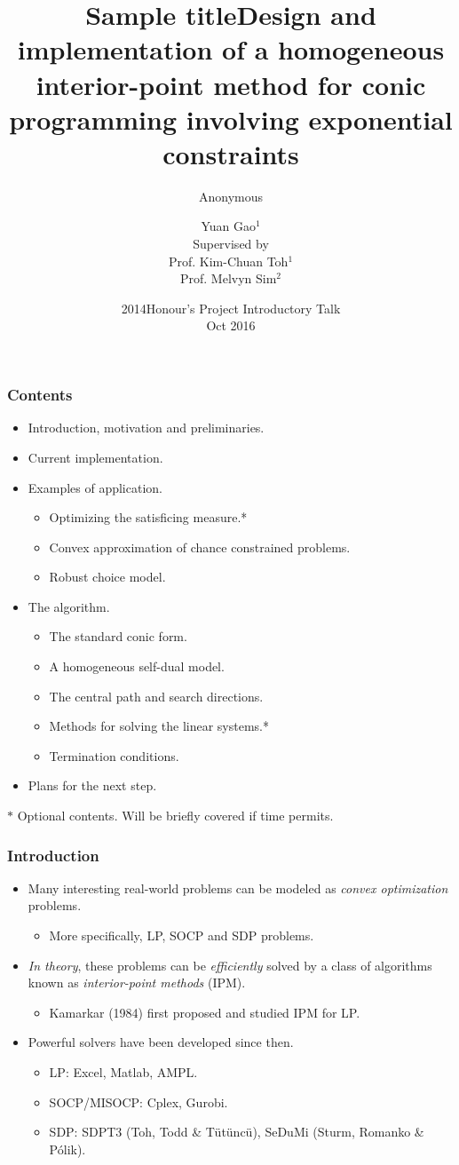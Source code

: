 \documentclass{beamer}
\title{Sample title}
\author{Anonymous}
\institute{ShareLaTeX}
\date{2014}
\title[About Beamer] %
 {Design and implementation of a homogeneous interior-point method for conic programming involving exponential constraints}
\author[gaoyuan] %
 {Yuan Gao$^1$ \\[1ex] Supervised by \\[0.5ex] Prof. Kim-Chuan Toh$^1$\\Prof. Melvyn Sim$^2$}
\institute[VFU] %
 {
 	$1$ Department of Mathematics, National University of Singapore\\
 	$2$ Department of Decision Sciences, National University of Singappore
 }
\date %
{Honour's Project Introductory Talk\\ Oct 2016}
\begin{document}
 
\frame{\titlepage}
 
\begin{frame}
\frametitle{Contents}
\begin{itemize}
	\item Introduction, motivation and preliminaries.
	\item Current implementation.
	\item Examples of application.
	\begin{itemize}
		\item Optimizing the satisficing measure.*
		\item Convex approximation of chance constrained problems.
		\item Robust choice model.
	\end{itemize}
		\item The algorithm.
	\begin{itemize}
		\item The standard conic form.
		\item A homogeneous self-dual model.
		\item The central path and search directions.
		\item Methods for solving the linear systems.*
		\item Termination conditions.
	\end{itemize}
	\item Plans for the next step.
\end{itemize}
\small{$*$ Optional contents. Will be briefly covered if time permits.}
\end{frame}

\begin{frame}
\frametitle{Introduction}
\begin{itemize}
\item Many interesting real-world problems can be modeled as \textit{convex optimization} problems.
	\begin{itemize}
		\item More specifically, LP, SOCP and SDP problems.
	\end{itemize}
\item \textit{In theory}, these problems can be \textit{efficiently} solved by a class of algorithms known as \textit{interior-point methods} (IPM).
	\begin{itemize}
		\item Kamarkar (1984) first proposed and studied IPM for LP.
	\end{itemize}
\item Powerful solvers have been developed since then.
	\begin{itemize}
		\item LP: Excel, Matlab, AMPL.
		\item SOCP/MISOCP: Cplex, Gurobi.
		\item SDP: SDPT3 (Toh, Todd \& T\"ut\"unc\"u), SeDuMi (Sturm, Romanko \& Pólik).
	\end{itemize}
\end{itemize}
\end{frame}
\end{document}
